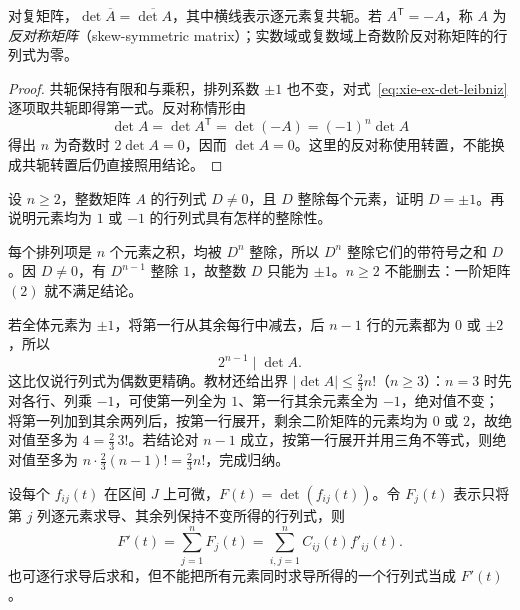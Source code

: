 \begin{proposition}
\label{prop:xie-ex-det-conjugate-skew}
对复矩阵，$\det\overline A=\overline{\det A}$，其中横线表示逐元素复共轭。若 $A^{\mathsf T}=-A$，称 $A$ 为\emph{反对称矩阵}（skew-symmetric matrix）；实数域或复数域上奇数阶反对称矩阵的行列式为零。
\end{proposition}

\begin{proof}
共轭保持有限和与乘积，排列系数 $\pm1$ 也不变，对式~\eqref{eq:xie-ex-det-leibniz} 逐项取共轭即得第一式。反对称情形由
\[
\det A=\det A^{\mathsf T}=\det(-A)=(-1)^n\det A
\]
得出 $n$ 为奇数时 $2\det A=0$，因而 $\det A=0$。这里的反对称使用转置，不能换成共轭转置后仍直接照用结论。
\end{proof}

\begin{example}
\label{ex:xie-ex-det-integrality}
设 $n\geq2$，整数矩阵 $A$ 的行列式 $D\ne0$，且 $D$ 整除每个元素，证明 $D=\pm1$。再说明元素均为 $1$ 或 $-1$ 的行列式具有怎样的整除性。
\end{example}

\begin{solve}
每个排列项是 $n$ 个元素之积，均被 $D^n$ 整除，所以 $D^n$ 整除它们的带符号之和 $D$。因 $D\ne0$，有 $D^{n-1}$ 整除 $1$，故整数 $D$ 只能为 $\pm1$。$n\geq2$ 不能删去：一阶矩阵 $(2)$ 就不满足结论。

若全体元素为 $\pm1$，将第一行从其余每行中减去，后 $n-1$ 行的元素都为 $0$ 或 $\pm2$，所以
\begin{equation}
\label{eq:xie-ex-det-sign-divisibility}
2^{n-1}\mid\det A.
\end{equation}
这比仅说行列式为偶数更精确。教材还给出界 $|\det A|\leq\frac23n!$（$n\geq3$）：$n=3$ 时先对各行、列乘 $-1$，可使第一列全为 $1$、第一行其余元素全为 $-1$，绝对值不变；将第一列加到其余两列后，按第一行展开，剩余二阶矩阵的元素均为 $0$ 或 $2$，故绝对值至多为 $4=\frac23\,3!$。若结论对 $n-1$ 成立，按第一行展开并用三角不等式，则绝对值至多为 $n\cdot\frac23(n-1)!=\frac23n!$，完成归纳。
\end{solve}

\begin{theorem}[行列式求导]
\label{thm:xie-ex-det-differentiation}
设每个 $f_{ij}(t)$ 在区间 $J$ 上可微，$F(t)=\det(f_{ij}(t))$。令 $F_j(t)$ 表示只将第 $j$ 列逐元素求导、其余列保持不变所得的行列式，则
\begin{equation}
\label{eq:xie-ex-det-differentiation}
F'(t)=\sum_{j=1}^{n}F_j(t)
=\sum_{i,j=1}^{n}C_{ij}(t)f'_{ij}(t).
\end{equation}
也可逐行求导后求和，但不能把所有元素同时求导所得的一个行列式当成 $F'(t)$。
\end{theorem}

